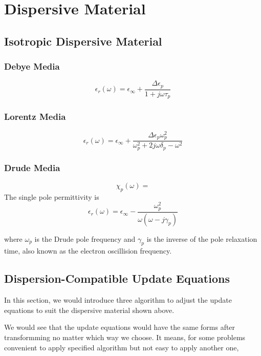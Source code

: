 \section{Dispersive Material}

\subsection{Isotropic Dispersive Material}
\subsubsection{Debye Media}

\begin{displaymath}
  \epsilon_r(\omega) = \epsilon_{\infty} + \frac{\Delta\epsilon_p}{1+j\omega\tau_p}
\end{displaymath}

\subsubsection{Lorentz Media}


\begin{displaymath}
  \epsilon_r(\omega) = \epsilon_{\infty} + \frac{\Delta\epsilon_p\omega_p^2}{\omega_p^2 + 2j\omega\delta_p - \omega^2}
\end{displaymath}


\subsubsection{Drude Media}
\[
\chi_p(\omega) = 
\]
The single pole permittivity is 
\begin{displaymath}
  \epsilon_r(\omega) = \epsilon_{\infty} - \frac{\omega_p^2}{\omega(\omega-j\gamma_p)}
\end{displaymath}

where $\omega_p$ is the Drude pole frequency and $\gamma_p$ is the inverse of the pole relaxation time, also known as the
electron oscillision frequency.



\subsection{Dispersion-Compatible Update Equations}

In this section, we would introduce three algorithm to adjust the update equations to suit the dispersive material shown
above.

We would see that the update equations would have the same forms after transformming no matter which way we choose. It
means, for some problems convenient to apply specified algorithm but not easy to apply another one, 

